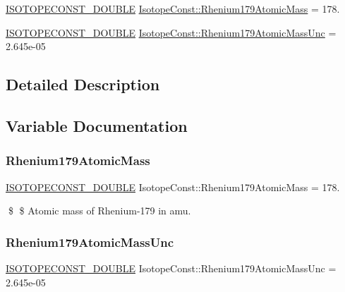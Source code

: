 \begin{DoxyCompactItemize}
\item 
\mbox{\hyperlink{group___isotope_const-_macros_ga8f45a7272ce02c0b4c65c44636ed719a}{I\+S\+O\+T\+O\+P\+E\+C\+O\+N\+S\+T\+\_\+\+D\+O\+U\+B\+LE}} \mbox{\hyperlink{group___isotope_const-_rhenium-_re179_ga0e0275296663de86d063640448fd6f52}{Isotope\+Const\+::\+Rhenium179\+Atomic\+Mass}} = 178.
\item 
\mbox{\hyperlink{group___isotope_const-_macros_ga8f45a7272ce02c0b4c65c44636ed719a}{I\+S\+O\+T\+O\+P\+E\+C\+O\+N\+S\+T\+\_\+\+D\+O\+U\+B\+LE}} \mbox{\hyperlink{group___isotope_const-_rhenium-_re179_gaab5e755c772abefe437610d34ce8051e}{Isotope\+Const\+::\+Rhenium179\+Atomic\+Mass\+Unc}} = 2.\+645e-\/05
\end{DoxyCompactItemize}


\subsection{Detailed Description}


\subsection{Variable Documentation}
\mbox{\label{group___isotope_const-_rhenium-_re179_ga0e0275296663de86d063640448fd6f52}} 
\subsubsection{\texorpdfstring{Rhenium179\+Atomic\+Mass}{Rhenium179AtomicMass}}
{\footnotesize\ttfamily \mbox{\hyperlink{group___isotope_const-_macros_ga8f45a7272ce02c0b4c65c44636ed719a}{I\+S\+O\+T\+O\+P\+E\+C\+O\+N\+S\+T\+\_\+\+D\+O\+U\+B\+LE}} Isotope\+Const\+::\+Rhenium179\+Atomic\+Mass = 178.}

\$ \$ Atomic mass of Rhenium-\/179 in amu. \mbox{\label{group___isotope_const-_rhenium-_re179_gaab5e755c772abefe437610d34ce8051e}} 
\subsubsection{\texorpdfstring{Rhenium179\+Atomic\+Mass\+Unc}{Rhenium179AtomicMassUnc}}
{\footnotesize\ttfamily \mbox{\hyperlink{group___isotope_const-_macros_ga8f45a7272ce02c0b4c65c44636ed719a}{I\+S\+O\+T\+O\+P\+E\+C\+O\+N\+S\+T\+\_\+\+D\+O\+U\+B\+LE}} Isotope\+Const\+::\+Rhenium179\+Atomic\+Mass\+Unc = 2.\+645e-\/05}

